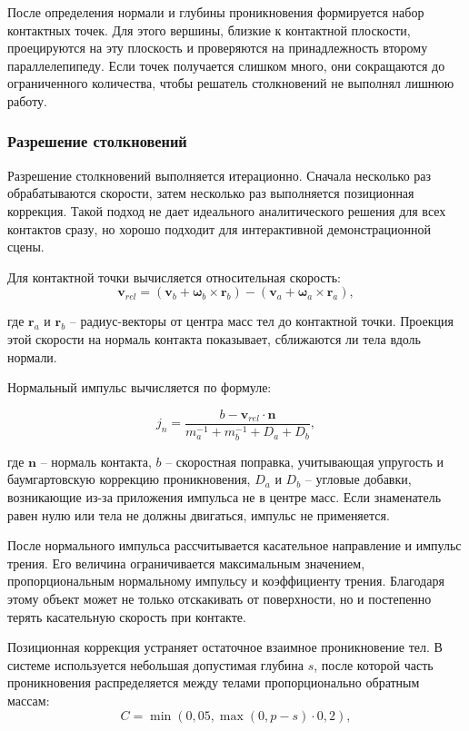 После определения нормали и глубины проникновения формируется набор контактных
точек. Для этого вершины, близкие к контактной плоскости, проецируются на эту
плоскость и проверяются на принадлежность второму параллелепипеду. Если точек
получается слишком много, они сокращаются до ограниченного количества, чтобы
решатель столкновений не выполнял лишнюю работу.

\subsubsection{Разрешение столкновений}

Разрешение столкновений выполняется итерационно. Сначала несколько раз
обрабатываются скорости, затем несколько раз выполняется позиционная коррекция.
Такой подход не дает идеального аналитического решения для всех контактов сразу,
но хорошо подходит для интерактивной демонстрационной сцены.

Для контактной точки вычисляется относительная скорость:
\[
\mathbf{v}_{rel}=(\mathbf{v}_b+\boldsymbol{\omega}_b\times\mathbf{r}_b)-
(\mathbf{v}_a+\boldsymbol{\omega}_a\times\mathbf{r}_a),
\]

где \(\mathbf{r}_a\) и \(\mathbf{r}_b\) -- радиус-векторы от центра масс тел до
контактной точки. Проекция этой скорости на нормаль контакта показывает,
сближаются ли тела вдоль нормали.

Нормальный импульс вычисляется по формуле:

\[
j_n=\frac{b-\mathbf{v}_{rel}\cdot\mathbf{n}}
{m_a^{-1}+m_b^{-1}+D_a+D_b},
\]

где \(\mathbf{n}\) -- нормаль контакта, \(b\) -- скоростная поправка, учитывающая
упругость и баумгартовскую коррекцию проникновения, \(D_a\) и \(D_b\) --
угловые добавки, возникающие из-за приложения импульса не в центре масс.
Если знаменатель равен нулю или тела не должны двигаться, импульс не применяется.

После нормального импульса рассчитывается касательное направление и импульс
трения. Его величина ограничивается максимальным значением, пропорциональным
нормальному импульсу и коэффициенту трения. Благодаря этому объект может не
только отскакивать от поверхности, но и постепенно терять касательную скорость
при контакте.

Позиционная коррекция устраняет остаточное взаимное проникновение тел. В
системе используется небольшая допустимая глубина \(s\), после которой часть
проникновения распределяется между телами пропорционально обратным массам:
\[
C=\min(0{,}05,\max(0,p-s)\cdot 0{,}2),
\]

